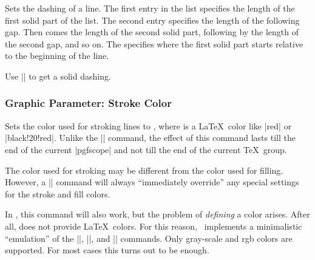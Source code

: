 \begin{command}{\pgfsetdash{}}
    Sets the dashing of a line. The first entry in the list specifies the
    length of the first solid part of the list. The second entry specifies the
    length of the following gap. Then comes the length of the second solid
    part, following by the length of the second gap, and so on. The
     specifies where the first solid part starts relative to the
    beginning of the line.
\begin{codeexample}[]
\begin{pgfpicture}
  \pgfsetdash{{0.5cm}{0.5cm}{0.1cm}{0.2cm}}{0cm}
  \pgfpathmoveto{\pgfpoint{0mm}{0mm}}
  \pgfpathlineto{\pgfpoint{2cm}{0mm}}
  \pgfsetdash{{0.5cm}{0.5cm}{0.1cm}{0.2cm}}{0.1cm}
  \pgfpathmoveto{\pgfpoint{0mm}{1mm}}
  \pgfpathlineto{\pgfpoint{2cm}{1mm}}
  \pgfsetdash{{0.5cm}{0.5cm}{0.1cm}{0.2cm}}{0.2cm}
  \pgfpathmoveto{\pgfpoint{0mm}{2mm}}
  \pgfpathlineto{\pgfpoint{2cm}{2mm}}
\end{pgfpicture}
\end{codeexample}

    Use |\pgfsetdash{}{0pt}| to get a solid dashing.
\end{command}


\subsubsection{Graphic Parameter: Stroke Color}

\begin{command}{\pgfsetstrokecolor{}}
    Sets the color used for stroking lines to , where 
    is a \LaTeX\ color like |red| or |black!20!red|. Unlike the |\color|
    command, the effect of this command lasts till the end of the current
    |{pgfscope}| and not till the end of the current \TeX\ group.

    The color used for stroking may be different from the color used for
    filling. However, a |\color| command will always ``immediately override''
    any special settings for the stroke and fill colors.

    In , this command will also work, but the problem of
    \emph{defining} a color arises. After all,  does not provide
    \LaTeX\ colors. For this reason, \pgfname\ implements a minimalistic
    ``emulation'' of the |\definecolor|, ||, and |\color| commands.
    Only gray-scale and rgb colors are supported. For most cases this turns out
    to be enough.
\begin{codeexample}[]
\begin{pgfpicture}
  \pgfsetlinewidth{1pt}
  \color{red}
  \pgfpathcircle{\pgfpoint{0cm}{0cm}}{3mm} 
  \pgfpathcircle{\pgfpoint{1cm}{0cm}}{3mm} 
  \color{red}
  \pgfpathcircle{\pgfpoint{2cm}{0cm}}{3mm} 
\end{pgfpicture}
\end{codeexample}
\end{command}

